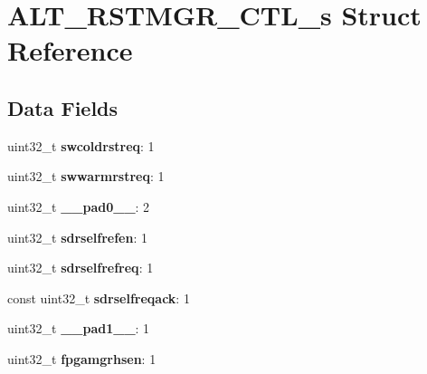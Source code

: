 \hypertarget{structALT__RSTMGR__CTL__s}{}\section{A\+L\+T\+\_\+\+R\+S\+T\+M\+G\+R\+\_\+\+C\+T\+L\+\_\+s Struct Reference}
\label{structALT__RSTMGR__CTL__s}
\subsection*{Data Fields}
\begin{DoxyCompactItemize}
\item 
\mbox{\label{structALT__RSTMGR__CTL__s_a92ba4bff1502d3d80cd7c63840b0e67a}} 
uint32\+\_\+t {\bfseries swcoldrstreq}\+: 1
\item 
\mbox{\label{structALT__RSTMGR__CTL__s_a9fc7ee267107a8f4d6aeb73035a71d45}} 
uint32\+\_\+t {\bfseries swwarmrstreq}\+: 1
\item 
\mbox{\label{structALT__RSTMGR__CTL__s_a03a7ec789798243d348027fe953d3af8}} 
uint32\+\_\+t {\bfseries \+\_\+\+\_\+pad0\+\_\+\+\_\+}\+: 2
\item 
\mbox{\label{structALT__RSTMGR__CTL__s_a97ed81620d7a676509233eaea815baeb}} 
uint32\+\_\+t {\bfseries sdrselfrefen}\+: 1
\item 
\mbox{\label{structALT__RSTMGR__CTL__s_a22c2e3e2888d66397940bc05a6e9bf6b}} 
uint32\+\_\+t {\bfseries sdrselfrefreq}\+: 1
\item 
\mbox{\label{structALT__RSTMGR__CTL__s_a2a0f0e5c69fd8f279a4056c5ed977555}} 
const uint32\+\_\+t {\bfseries sdrselfreqack}\+: 1
\item 
\mbox{\label{structALT__RSTMGR__CTL__s_a87ebeb3013ed56221b7c0ca4ffe31b5b}} 
uint32\+\_\+t {\bfseries \+\_\+\+\_\+pad1\+\_\+\+\_\+}\+: 1
\item 
\mbox{\label{structALT__RSTMGR__CTL__s_a95b5215b8c0f7719a4114577551e35db}} 
uint32\+\_\+t {\bfseries fpgamgrhsen}\+: 1
\item 

\end{DoxyCompactItemize}
